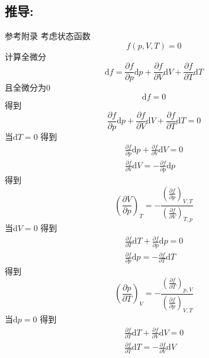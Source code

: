 \subsection{推导:}
参考附录
考虑状态函数 
\begin{equation}
    f(p, V, T) = 0
\end{equation}
计算全微分
\begin{equation}
\mathrm{d}f=\frac{\partial f}{\partial p}\mathrm{d}p+\frac{\partial f}{\partial V}\mathrm{d}V+\frac{\partial f}{\partial T}\mathrm{d}T
\end{equation}
且全微分为0
\begin{equation}
\mathrm{d}f=0
\end{equation}
得到
\begin{equation}
\frac{\partial f}{\partial p}\mathrm{d}p+\frac{\partial f}{\partial V}\mathrm{d}V+\frac{\partial f}{\partial T}\mathrm{d}T=0
\end{equation}
当$\mathrm{d}T=0$
得到
\begin{equation}
\begin{aligned}
\frac{\partial f}{\partial p}\mathrm{d}p+\frac{\partial f}{\partial V}\mathrm{d}V=0
\\
\frac{\partial f}{\partial V}\mathrm{d}V=-\frac{\partial f}{\partial p}\mathrm{d}p
\end{aligned}
\end{equation}
得到
\begin{equation}
\left( \frac{\partial V}{\partial p} \right) _T=-\frac{\left( \frac{\partial f}{\partial p} \right) _{V,T}}{\left( \frac{\partial f}{\partial V} \right) _{T,p}}
\end{equation}
当$\mathrm{d}V=0$
得到
\begin{equation}
\begin{aligned}
\frac{\partial f}{\partial T}\mathrm{d}T+\frac{\partial f}{\partial p}\mathrm{d}p=0
\\
\frac{\partial f}{\partial p}\mathrm{d}p=-\frac{\partial f}{\partial T}\mathrm{d}T
\end{aligned}
\end{equation}
得到
\begin{equation}
\left( \frac{\partial p}{\partial T} \right) _V=-\frac{\left( \frac{\partial f}{\partial T} \right) _{p,V}}{\left( \frac{\partial f}{\partial p} \right) _{V,T}}
\end{equation}
当$\mathrm{d}p=0$
得到
\begin{equation}
\begin{aligned}
\frac{\partial f}{\partial T}\mathrm{d}T+\frac{\partial f}{\partial V}\mathrm{d}V=0
\\
\frac{\partial f}{\partial T}\mathrm{d}T=-\frac{\partial f}{\partial V}\mathrm{d}V
\end{aligned}
\end{equation}
